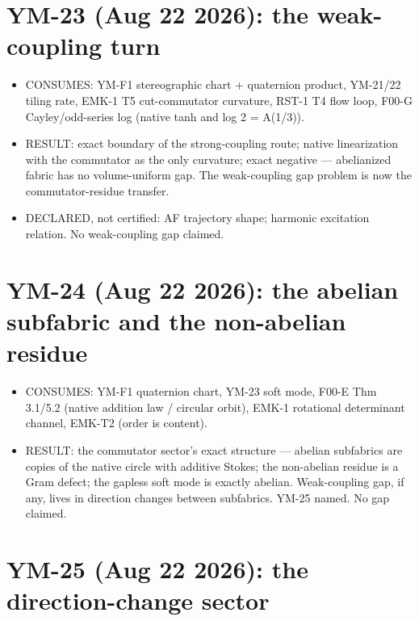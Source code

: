 \hypertarget{ym-23-aug-22-2026-the-weak-coupling-turn}{%
\section{YM-23 (Aug 22 2026): the weak-coupling turn}\label{ym-23-aug-22-2026-the-weak-coupling-turn}}

\begin{itemize}
\tightlist
\item
  CONSUMES: YM-F1 stereographic chart + quaternion product, YM-21/22
  tiling rate, EMK-1 T5 cut-commutator curvature, RST-1 T4 flow loop,
  F00-G Cayley/odd-series log (native tanh and log 2 = A(1/3)).
\item
  RESULT: exact boundary of the strong-coupling route; native
  linearization with the commutator as the only curvature; exact
  negative --- abelianized fabric has no volume-uniform gap. The
  weak-coupling gap problem is now the commutator-residue transfer.
\item
  DECLARED, not certified: AF trajectory shape; harmonic excitation
  relation. No weak-coupling gap claimed.
\end{itemize}

\hypertarget{ym-24-aug-22-2026-the-abelian-subfabric-and-the-non-abelian-residue}{%
\section{YM-24 (Aug 22 2026): the abelian subfabric and the non-abelian residue}\label{ym-24-aug-22-2026-the-abelian-subfabric-and-the-non-abelian-residue}}

\begin{itemize}
\tightlist
\item
  CONSUMES: YM-F1 quaternion chart, YM-23 soft mode, F00-E Thm 3.1/5.2
  (native addition law / circular orbit), EMK-1 rotational determinant
  channel, EMK-T2 (order is content).
\item
  RESULT: the commutator sector's exact structure --- abelian subfabrics
  are copies of the native circle with additive Stokes; the non-abelian
  residue is a Gram defect; the gapless soft mode is exactly abelian.
  Weak-coupling gap, if any, lives in direction changes between
  subfabrics. YM-25 named. No gap claimed.
\end{itemize}

\hypertarget{ym-25-aug-22-2026-the-direction-change-sector}{%
\section{YM-25 (Aug 22 2026): the direction-change sector}\label{ym-25-aug-22-2026-the-direction-change-sector}}

